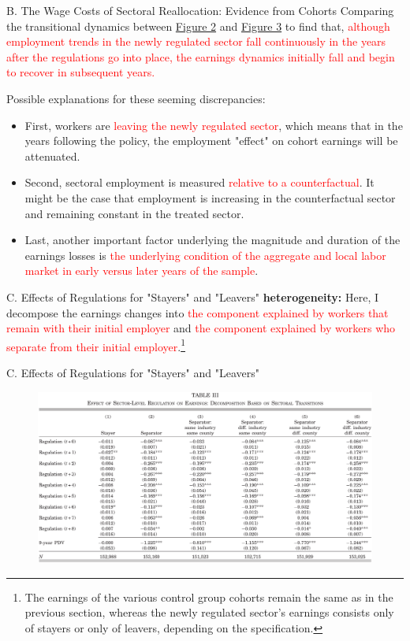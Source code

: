 \documentclass{beamer}
\begin{document}
\begin{frame}{B. The Wage Costs of Sectoral Reallocation: Evidence from Cohorts}
	Comparing the transitional dynamics between \textcolor{blue}{\hyperlink{figure2}{Figure 2}} and \textcolor{blue}{\hyperlink{figure3}{Figure 3}} to find that, \textcolor{red}{although employment trends in the newly regulated sector fall continuously in the years after the regulations go into place, the earnings dynamics initially fall and begin to recover in subsequent years.}
	\medskip

	Possible explanations for these seeming discrepancies:
	\begin{itemize}
		\item First, workers are \textcolor{red}{leaving the newly regulated sector}, which means that in the years following the policy, the employment "effect" on cohort earnings will be attenuated.
		\item Second, sectoral employment is measured \textcolor{red}{relative to a counterfactual}. It might be the case that employment is increasing in the counterfactual sector and remaining constant in the treated sector.
		\item Last, another important factor underlying the magnitude and duration of the earnings losses is \textcolor{red}{the underlying condition of the aggregate and local labor market in early versus later years of the sample}.
	\end{itemize}
\end{frame}
\begin{frame}{C. Effects of Regulations for "Stayers" and "Leavers"}
	\textbf{heterogeneity:} Here, I decompose the earnings changes into \textcolor{red}{the component explained by workers that remain with their initial employer} and \textcolor{red}{the component explained by workers who separate from their initial employer}.\footnote{The earnings of the various control group cohorts remain the same as in the previous section, whereas the newly regulated sector's earnings consists only of stayers or only of leavers, depending on the specification.}
\end{frame}
\begin{frame}{C. Effects of Regulations for "Stayers" and "Leavers"}
	\begin{figure}[h]
		\centering
		\includegraphics[scale=0.37]{table3.png}
	\end{figure}
\end{frame}
\end{document}
